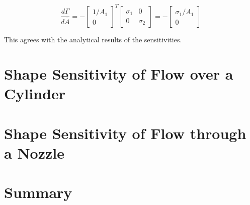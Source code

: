 \begin{equation}
    \frac{d \Gamma}{d \bar{A}} = 
    -\begin{bmatrix}
    1/A_1 \\
    0
    \end{bmatrix}^T
    \begin{bmatrix}
    \sigma_1 & 0 \\
    0 & \sigma_2
    \end{bmatrix} =
    -
    \begin{bmatrix}
    \sigma_1 / A_1 \\
    0
    \end{bmatrix}
\end{equation}

This agrees with the analytical results of the sensitivities. 


\section{Shape Sensitivity of Flow over a Cylinder}

\section{Shape Sensitivity of Flow through a Nozzle}

\section{Summary}
